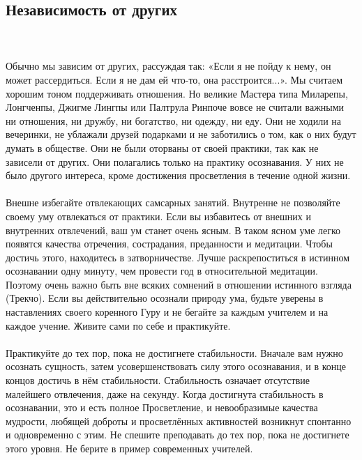 \subsection{Независимость от других}
\\ \\ Обычно мы зависим от других, рассуждая так: «Если я не пойду к нему, он может рассердиться. Если я не дам ей что-то, она расстроится...». Мы считаем хорошим тоном поддерживать отношения. Но великие Мастера типа Миларепы, Лонгченпы, Джигме Лингпы или Палтрула Ринпоче вовсе не считали важными ни отношения, ни дружбу, ни богатство, ни одежду, ни еду. Они не ходили на вечеринки, не ублажали друзей подарками и не заботились о том, как о них будут думать в обществе. Они не были оторваны от своей практики, так как не зависели от других. Они полагались только на практику осознавания. У них не было другого интереса, кроме достижения просветления в течение одной жизни.
\\ \\ Внешне избегайте отвлекающих самсарных занятий. Внутрен\-не не позволяйте своему уму отвлекаться от практики. Если вы избавитесь от внешних и внутренних отвлечений, ваш ум станет очень ясным. В таком ясном уме легко появятся качества отречения, сострадания, преданности и медитации. Чтобы достичь этого, находитесь в затворничестве. Лучше раскрепоститься в истинном осознавании одну минуту, чем провести год в относительной медитации. Поэтому очень важно быть вне всяких сомнений в отношении истинного взгляда (Трекчо). Если вы действительно осознали природу ума, будьте уверены в наставлениях своего коренного Гуру и не бегайте за каждым учителем и на каждое учение. Живите сами по себе и практикуйте.
\\ \\ Практикуйте до тех пор, пока не достигнете стабильности. Вначале вам нужно осознать сущность, затем усовершенствовать силу этого осознавания, и в конце концов достичь в нём стабильности. Стабильность означает отсутствие малейшего отвлечения, даже на секунду. Когда достигнута стабильность в осознавании, это и есть полное Просветление, и невообрази\-мые качества мудрости, любящей доброты и просветлённых активностей возникнут спонтанно и одновременно с этим. Не спешите преподавать до тех пор, пока не достигнете этого уровня. Не берите в пример современных учителей.
